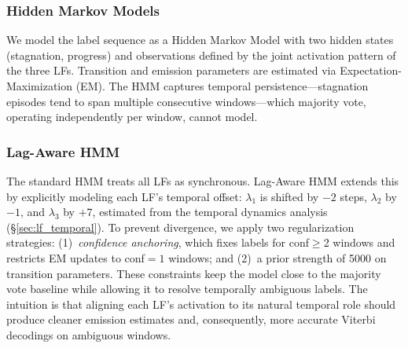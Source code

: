 \subsubsection{Hidden Markov Models}
\label{sec:hmm}

We model the label sequence as a Hidden Markov Model \citep{safranchik2020linkedhmm} with two hidden states (stagnation, progress) and observations defined by the joint activation pattern of the three LFs.
Transition and emission parameters are estimated via Expectation-Maximization (EM).
The HMM captures temporal persistence---stagnation episodes tend to span multiple consecutive windows---which majority vote, operating independently per window, cannot model.

\subsubsection{Lag-Aware HMM}
\label{sec:lag_hmm}

The standard HMM treats all LFs as synchronous.
Lag-Aware HMM extends this by explicitly modeling each LF's temporal offset: $\lambda_1$ is shifted by $-2$ steps, $\lambda_2$ by $-1$, and $\lambda_3$ by $+7$, estimated from the temporal dynamics analysis (\S\ref{sec:lf_temporal}).
To prevent divergence, we apply two regularization strategies: (1)~\emph{confidence anchoring}, which fixes labels for conf${\geq}$2 windows and restricts EM updates to conf${=}1$ windows; and (2)~a prior strength of 5000 on transition parameters.
These constraints keep the model close to the majority vote baseline while allowing it to resolve temporally ambiguous labels.
The intuition is that aligning each LF's activation to its natural temporal role should produce cleaner emission estimates and, consequently, more accurate Viterbi decodings on ambiguous windows.
